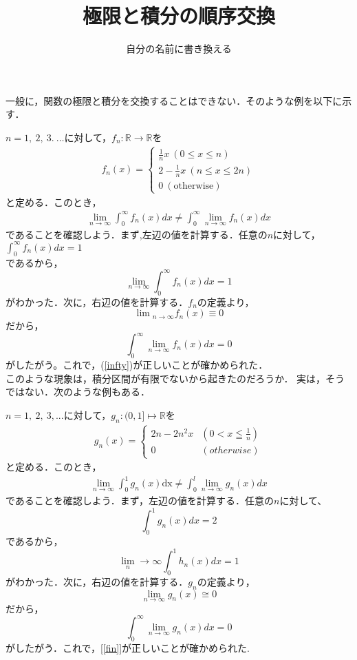 \documentclass[uplatex]{jsarticle}
\title{極限と積分の順序交換}
\begin{document}
\author{自分の名前に書き換える}
\maketitle

一般に，関数の極限と積分を交換することはできない．そのような例を以下に示す．

$n=1,~2,~3.~\ldots$に対して，$f_{n}:\mathbb{R}\to\mathbb{R}$を
\begin{align*}
f_{n}(x)=
  \begin{cases}
  \frac{1}{n}x~(0\leq x\leq n)\\
  2-\frac{1}{n}x~(n\leq x\leq 2n)\\
  0~(\text{otherwise})
  \end{cases}
\end{align*}
と定める．このとき，
\begin{align}
 \lim_{n\to\infty}\int_{0}^{\infty}f_{n}(x)dx
 \neq\int_{0}^{\infty}\lim_{n\to\infty}f_{n}(x)dx\label{infty}
\end{align}
であることを確認しよう．まず,左辺の値を計算する．任意の$n$に対して，\\
$\int_{0}^{\infty}f_{n}(x)dx=1$\\
であるから，
\[
 \lim_{n\to\infty}\int_{0}^{\infty}f_{n}(x)dx=1
\]
がわかった．次に，右辺の値を計算する．$f_{n}$の定義より，
\[
 \lim{}_{n\to\infty}f_{n}(x)\equiv 0
\]
だから，
\[
 \int_{0}^{\infty}\lim_{n\to\infty}f_{n}(x)dx=0
\]
がしたがう。これで，(\ref{infty})が正しいことが確かめられた．\\
このような現象は，積分区間が有限でないから起きたのだろうか．
実は，そうではない．次のような例もある．

$n=1,~2,~3, ...$に対して，$g_{n}:(0,1]\mapsto\mathbb{R}$を
\begin{align*}
g_{n}(x)=
  \begin{cases}
  2n-2n^{2}x & (0<x≦\frac{1}{n})\\
  0 & (otherwise)
  \end{cases}
\end{align*}
と定める．このとき，
\begin{align}
 \lim_{n\to\infty}\int_{0}^{1}g_{n}(x)\mathrm{dx}
 \neq\int_{0}^{l}\lim_{n\to\infty}g_{n}(x)dx\label{fin}
\end{align}
であることを確認しよう．まず，左辺の値を計算する．任意の$n$に対して、
\[
 \int_{0}^{1}g_{n}(x)dx=2
\]
であるから，
\[
 \lim_n\to\infty\int_{0}^{1}h_{n}(x)dx=1
\]
がわかった．次に，右辺の値を計算する．$g_{n}の定義より，$
\[
 \lim_{n\to\infty}g_{n}(x)\cong 0
\]
だから，
\[
 \int_{0}^{\infty}\lim_{n\to\infty}g_{n}(x)dx=0
\]
がしたがう．これで，[\ref{fin}]が正しいことが確かめられた.
\end{document}
